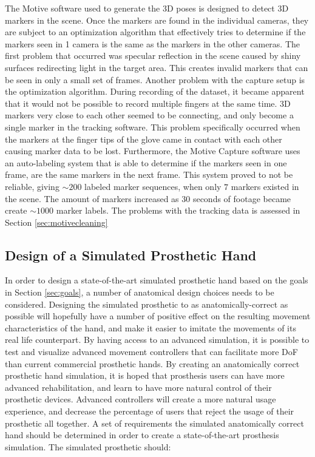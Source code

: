 \documentclass[../main.tex]{subfiles}
\begin{document}
The  Motive software used to generate the 3D poses is designed to detect 3D markers in the scene.
Once the markers are found in the individual cameras, they are subject to an optimization algorithm that effectively tries to determine if the markers seen in 1 camera is the same as the markers in the other cameras.
The first problem that occurred was \gls{specular reflection} in the scene caused by shiny surfaces redirecting light in the target area.
This creates invalid markers that can be seen in only a small set of frames.
Another problem with the capture setup is the optimization algorithm.
During recording of the dataset, it became apparent that it would not be possible to record multiple fingers at the same time.
3D markers very close to each other seemed to be connecting, and only become a single marker in the tracking software.
This problem specifically occurred when the markers at the finger tips of the glove came in contact with each other causing marker data to be lost.
Furthermore, the Motive Capture software uses an auto-labeling system that is able to determine if the markers seen in one frame, are the same markers in the next frame.
This system proved to not be reliable, giving $\sim 200$ labeled marker sequences, when only $7$ markers existed in the scene.
The amount of markers increased as 30 seconds of footage became create $\sim 1000$ marker labels.
The problems with the tracking data is assessed in Section \ref{sec:motivecleaning}

\subsection{Design of a Simulated Prosthetic Hand}
\label{sec:prost_sim}

In order to design a state-of-the-art simulated prosthetic hand based on the goals in Section \ref{sec:goals}, a number of anatomical design choices needs to be considered.
Designing the simulated prosthetic to as anatomically-correct as possible will hopefully have a number of positive effect on the resulting movement characteristics of the hand, and make it easier to imitate the movements of its real life counterpart.
By having access to an advanced simulation, it is possible to test and visualize advanced movement controllers that can facilitate more DoF than current commercial prosthetic hands. 
By creating an anatomically correct prosthetic hand simulation, it is hoped that prosthesis users can have more advanced rehabilitation, and learn to have more natural control of their prosthetic devices.
Advanced controllers will create a more natural usage experience, and decrease the percentage of users that reject the usage of their prosthetic all together.
A set of requirements the simulated anatomically correct hand should be determined in order to create a state-of-the-art prosthesis simulation.
The simulated prosthetic should:
\end{document}
